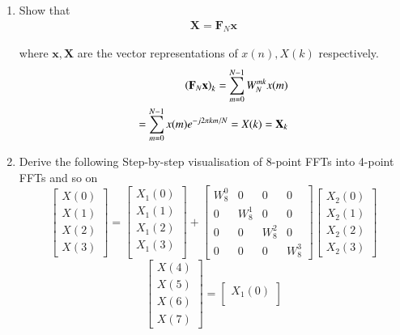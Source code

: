 \documentclass[journal,12pt,twocolumn]{IEEEtran}
\let\vec\mathbf
\renewcommand\thesection{\arabic{section}}
\begin{document}
\begin{enumerate}[label=\arabic*.,ref=\thesection.\theenumi]
\item Show that 
\begin{align}
	\vec{X} = \vec{F}_N \vec{x}
	\label{eq:dft-mat-def}
\end{align}

where $\vec{x}, \vec{X}$ are the vector representations of $x(n), X(k)$ respectively.\\
\solution
\begin{align}
	\brak{\vec{F}_{N}\vec{x}}_{k} = \sum_{m=0}^{N-1}W_{N}^{mk}x(m)\\
	 = \sum_{m=0}^{N-1} x(m) e^{-j 2 \pi k m / N}
	 = X(k) = \vec{X}_{k} 
\end{align}

\item Derive the following Step-by-step visualisation  of
8-point FFTs into 4-point FFTs and so on
\begin{equation}
	\begin{bmatrix}
		X(0) \\ 
		X(1) \\ 
		X(2) \\ 
		X(3)
	\end{bmatrix}
	=
	\begin{bmatrix}
		X_{1}(0) \\ 
		X_{1}(1)\\ 
		X_{1}(2)\\
		X_{1}(3)\\
	\end{bmatrix}
	+
	\begin{bmatrix}
		W^{0}_{8} & 0 & 0 & 0\\
		0 & W^{1}_{8} & 0 & 0\\
		0 & 0 & W^{2}_{8} & 0\\
		0 & 0 & 0 & W^{3}_{8}
	\end{bmatrix}
	\begin{bmatrix}
		X_{2}(0) \\ 
		X_{2}(1) \\ 
		X_{2}(2) \\
		X_{2}(3)
	\end{bmatrix}
\end{equation}
\begin{equation}
	\begin{bmatrix}
		X(4) \\ 
		X(5) \\ 
		X(6) \\ 
		X(7)
	\end{bmatrix}
	=
	\begin{bmatrix}
		X_{1}(0) \\ 

\end{bmatrix}
\end{equation}
\end{enumerate}
\end{document}
